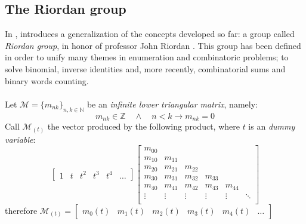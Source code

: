 
\subsection{The Riordan group}
\label{subsection:back:to:the:basics:riordan:group}

In \cite{shapiro:1991}, \citeauthor{shapiro:1991} introduces a
generalization of the concepts developed so far: a group called 
\emph{Riordan group}, in honor of professor John Riordan
.
This group has been defined in order to unify many themes in 
enumeration and combinatoric problems; to solve binomial, 
inverse identities and, more recently, combinatorial
sums and binary words counting. 
\\\\
Let $\mathcal{M}=\lbrace m_{nk}\rbrace_{n,k\in\mathbb{N}}$ be an \emph{infinite
lower triangular matrix}, namely:
\begin{displaymath}
     m_{nk}\in\mathbb{Z} \quad\wedge\quad n < k \rightarrow m_{nk} = 0
\end{displaymath}
Call $\mathcal{M}_{(t)}$ the vector produced by the following product, 
where $t$ is an \emph{dummy variable}:
\begin{displaymath}
    \left[
        \begin{array}{cccccc}
            1 & t & t^{2} & t^{3} & t^{4} &\ldots
        \end{array}
    \right]
    \left[
        \begin{array}{cccccc}
            m_{00} & & & &  &\\
            m_{10} & m_{11} & & &  &\\
            m_{20} & m_{21}& m_{22}& &  &\\
            m_{30} & m_{31}& m_{32}& m_{33}&  &\\
            m_{40} & m_{41}& m_{42}& m_{43}& m_{44} &\\
            \vdots & \vdots& \vdots& \vdots& \vdots & \ddots\\
        \end{array}
    \right]
\end{displaymath}
therefore $\mathcal{M}_{(t)} =
    \left[
        \begin{array}{cccccc}
            m_{0}(t) & m_{1}(t) & m_{2}(t) & m_{3}(t) &m_{4}(t) & \ldots
        \end{array}
    \right]$ 
